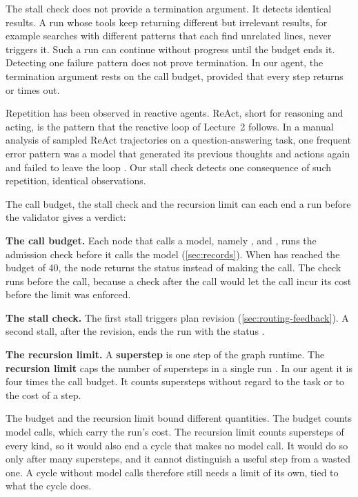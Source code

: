 The stall check does not provide a termination argument. It detects identical results. A run whose
tools keep returning different but irrelevant results, for example searches with different patterns
that each find unrelated lines, never triggers it. Such a run can continue without progress until the
budget ends it. Detecting one failure pattern does not prove termination. In our agent, the
termination argument rests on the call budget, provided that every step returns or times out.

Repetition has been observed in reactive agents. ReAct, short for reasoning and acting, is the
pattern that the reactive loop of Lecture~2 follows. In a manual analysis of sampled ReAct
trajectories on a question-answering task, one frequent error pattern was a model that generated its
previous thoughts and actions again and failed to leave the loop \citep[\S3.3]{yao2023react}. Our
stall check detects one consequence of such repetition, identical observations.

The call budget, the stall check and the recursion limit can each end a run before the validator
gives a verdict:
\bi
\item \textbf{The call budget.} Each node that calls a model, namely ,
 and , runs the admission check before it calls the model
(\cref{sec:records}). When
 has reached the budget of 40, the node returns the status
 instead of making the call. The check runs before the call, because a
check after the call would let the call incur its cost before the limit was enforced.
\item \textbf{The stall check.} The first stall triggers plan revision (\cref{sec:routing-feedback}).
A second stall, after the revision, ends the run with the status .
\item \textbf{The recursion limit.} A \textbf{superstep} is one step of the graph runtime. The
\textbf{recursion limit} caps the number of supersteps in a single run \citep{langgraph-graph-api}.
In our agent it is four times the call budget. It counts supersteps without regard to the task or
to the cost of a step.
\ei

The budget and the recursion limit bound different quantities. The budget counts model calls, which
carry the run's cost. The recursion limit counts supersteps of every kind, so it would also end a
cycle that makes no model call. It would do so only after many supersteps, and it cannot distinguish
a useful step from a wasted one. A cycle without model calls therefore still needs a limit of its
own, tied to what the cycle does.

